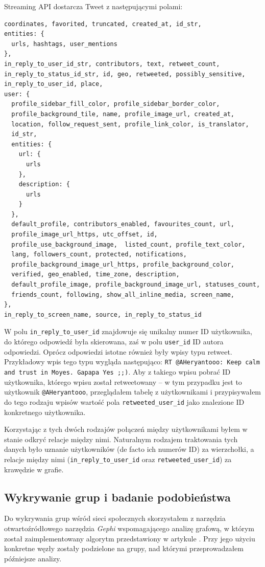 Streaming API dostarcza Tweet z następującymi polami: 
\begin{verbatim}
coordinates, favorited, truncated, created_at, id_str,
entities: {
  urls, hashtags, user_mentions
},
in_reply_to_user_id_str, contributors, text, retweet_count, 
in_reply_to_status_id_str, id, geo, retweeted, possibly_sensitive, 
in_reply_to_user_id, place,
user: {
  profile_sidebar_fill_color, profile_sidebar_border_color, 
  profile_background_tile, name, profile_image_url, created_at, 
  location, follow_request_sent, profile_link_color, is_translator,
  id_str, 
  entities: {
    url: {
      urls
    },
    description: {
      urls
    }
  },
  default_profile, contributors_enabled, favourites_count, url, 
  profile_image_url_https, utc_offset, id, 
  profile_use_background_image,  listed_count, profile_text_color, 
  lang, followers_count, protected, notifications, 
  profile_background_image_url_https, profile_background_color,
  verified, geo_enabled, time_zone, description,
  default_profile_image, profile_background_image_url, statuses_count,
  friends_count, following, show_all_inline_media, screen_name, 
},
in_reply_to_screen_name, source, in_reply_to_status_id
\end{verbatim} 

W polu \texttt{in\_reply\_to\_user\_id} znajdowuje się unikalny numer ID
użytkownika, do którego odpowiedź była skierowana, zaś w polu \texttt{user\_id}
ID autora odpowiedzi. 
Oprócz odpowiedzi istotne również były wpisy typu retweet. Przykładowy wpis tego
typu wygląda następująco: \texttt{RT @AHeryantooo: Keep calm and trust in Moyes. Gapapa Yes ;;)}.
Aby z takiego wpisu pobrać ID użytkownika, którego wpisu został retweetowany -- w tym
przypadku jest to użytkownik \texttt{@AHeryantooo}, przeglądałem tabelę z użytkownikami
i przypisywałem do tego rodzaju wpisów wartość pola \texttt{retweeted\_user\_id}
jako znalezione ID konkretnego użytkownika.

Korzystając z tych dwóch rodzajów połączeń między użytkownikami byłem w stanie 
odkryć relacje między nimi. Naturalnym rodzajem traktowania tych danych było
uznanie użytkowników (de facto ich numerów ID) za wierzchołki, a relacje między nimi
(\texttt{in\_reply\_to\_user\_id} oraz \texttt{retweeted\_user\_id}) za krawędzie
w grafie.

 \subsection{Wykrywanie grup i badanie podobieństwa}
 \label{section:koncepcja-wykrywaniegrup}
Do wykrywania grup wśród sieci społecznych skorzystałem z narzędzia
otwartoźródłowego narzędzia \textit{Gephi} wspomagającego analizę grafową, w
którym został zaimplementowany algorytm przedstawiony w artykule
\cite{blondel2008fuc}. Przy jego użyciu konkretne węzły zostały podzielone
na grupy, nad którymi przeprowadzałem późniejsze analizy.



